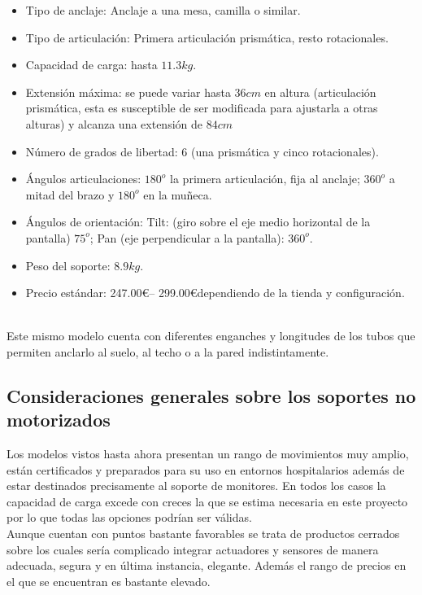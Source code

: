  \begin{minipage}{0.65\textwidth}\raggedright
 	\hspace{1cm}
 	\begin{itemize}
 		\item Tipo de anclaje: Anclaje a una mesa, camilla o similar.
 		\item Tipo de articulación: Primera articulación prismática, resto rotacionales.
 		\item Capacidad de carga: hasta $11.3kg$.
 		\item Extensión máxima: se puede variar hasta $36cm$ en altura (articulación prismática, esta es susceptible de ser modificada para ajustarla a otras alturas) y alcanza una extensión de $84cm$
 		\item Número de grados de libertad: 6 (una prismática y cinco rotacionales).
 		\item Ángulos articulaciones: $180^o$ la primera articulación, fija al anclaje; $360^o$ a mitad del brazo y $180^o$ en la muñeca.
 		\item Ángulos de orientación: Tilt: (giro sobre el eje medio horizontal de la pantalla) $75^o$; Pan (eje perpendicular a la pantalla): $360^o$.
 		\item Peso del soporte: $8.9kg$.
 		\item Precio estándar: 247.00\euro – 299.00\euro dependiendo de la tienda y configuración.
 	\end{itemize}
 \end{minipage}
 \\

 \vspace{0.1cm}
 Este mismo modelo cuenta con diferentes enganches y longitudes de los tubos que permiten anclarlo al suelo, al techo o a la pared indistintamente.

 \subsection{Consideraciones generales sobre los soportes no motorizados}
 Los modelos vistos hasta ahora presentan un rango de movimientos muy amplio, están certificados y preparados para su uso en entornos hospitalarios además de estar destinados precisamente al soporte de monitores. En todos los casos la capacidad de carga excede con creces la que se estima necesaria en este proyecto por lo que todas las opciones podrían ser válidas.
 \\

 Aunque cuentan con puntos bastante favorables se trata de productos cerrados sobre los cuales sería complicado integrar actuadores y sensores de manera adecuada, segura y en última instancia, elegante. Además el rango de precios en el que se encuentran es bastante elevado.

